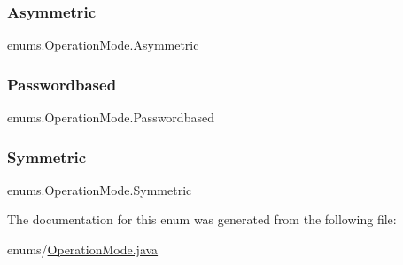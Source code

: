 \subsubsection{\texorpdfstring{Asymmetric}{Asymmetric}}
{\footnotesize\ttfamily enums.\+Operation\+Mode.\+Asymmetric}

\mbox{\label{enumenums_1_1_operation_mode_a8d0719056b641107c56a4fd845a14595}} 
\subsubsection{\texorpdfstring{Passwordbased}{Passwordbased}}
{\footnotesize\ttfamily enums.\+Operation\+Mode.\+Passwordbased}

\mbox{\label{enumenums_1_1_operation_mode_a29f20e790bc10adf40ae710c647c5823}} 
\subsubsection{\texorpdfstring{Symmetric}{Symmetric}}
{\footnotesize\ttfamily enums.\+Operation\+Mode.\+Symmetric}



The documentation for this enum was generated from the following file\+:\begin{DoxyCompactItemize}
\item 
enums/\mbox{\hyperlink{_operation_mode_8java}{Operation\+Mode.\+java}}\end{DoxyCompactItemize}
